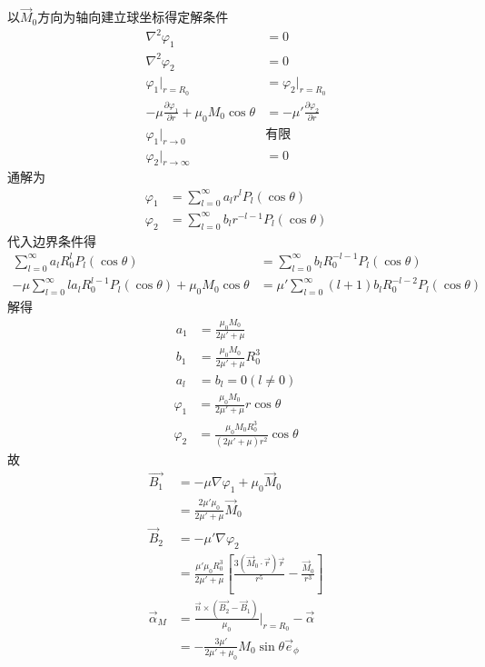 \documentclass{phyasgn}
\begin{document}
\begin{sol}[7]
    以$\vec{M}_0$方向为轴向建立球坐标得定解条件
    \begin{align*}
        \nabla^2\varphi_1&=0\\
        \nabla^2\varphi_2&=0\\
        \varphi_1|_{r=R_0}&=\varphi_2|_{r=R_0}\\
        -\mu\frac{\partial \varphi_1}{\partial r}+\mu_0M_0\cos\theta&=-\mu'\frac{\partial \varphi_2}{\partial r}\\
        \varphi_1|_{r\to0}&\text{有限}\\
        \varphi_2|_{r\to\infty}&=0
    \end{align*}
    通解为
    \begin{align*}
        \varphi_1&=\sum_{l=0}^{\infty}a_lr^lP_l(\cos\theta)\\
        \varphi_2&=\sum_{l=0}^{\infty}b_lr^{-l-1}P_l(\cos\theta)
    \end{align*}
    代入边界条件得
    \begin{align*}
        \sum_{l=0}^{\infty}a_lR_0^lP_l(\cos\theta)&=\sum_{l=0}^{\infty}b_lR_0^{-l-1}P_l(\cos\theta)\\
        -\mu\sum_{l=0}^{\infty}la_lR_0^{l-1}P_l(\cos\theta)+\mu_0M_0\cos\theta&=\mu'\sum_{l=0}^{\infty}(l+1)b_lR_0^{-l-2}P_l(\cos\theta)
    \end{align*}
    解得
    \begin{align*}
        a_1&=\frac{\mu_0M_0}{2\mu'+\mu}\\
        b_1&=\frac{\mu_0M_0}{2\mu'+\mu}R_0^3\\
        a_l&=b_l=0(l\neq0)
    \end{align*}
    \begin{align*}
        \varphi_1&=\frac{\mu_0M_0}{2\mu'+\mu}r\cos\theta\\
        \varphi_2&=\frac{\mu_0M_0R_0^3}{(2\mu'+\mu)r^2}\cos\theta
    \end{align*}
    故
    \begin{align*}
        \vec{B_1}&=-\mu\nabla\varphi_1+\mu_0\vec{M}_0\\
        &=\frac{2\mu'\mu_0}{2\mu'+\mu}\vec{M}_0\\
        \vec{B}_2&=-\mu'\nabla\varphi_2\\
        &=\frac{\mu'\mu_0R_0^3}{2\mu'+\mu}\left[\frac{3(\vec{M}_0\cdot\vec{r})\vec{r}}{r^5}-\frac{\vec{M}_0}{r^3}\right]\\
        \vec{\alpha}_M&=\frac{\vec{n}\times(\vec{B_2}-\vec{B}_1)}{\mu_0}|_{r=R_0}-\vec{\alpha}\\
        &=-\frac{3\mu'}{2\mu'+\mu_0}M_0\sin\theta\vec{e}_\phi
    \end{align*}
\end{sol}
\end{document}
